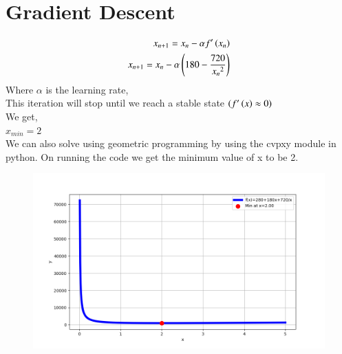 \documentclass[journal,12pt,onecolumn]{IEEEtran}
\theoremstyle{remark}
\begin{document}
\section{Gradient Descent}
\begin{align}
    x_{n+1}=x_n-\alpha f^{\prime}\left(x_n\right)\\
     x_{n+1}=x_n-\alpha \left(180-\frac{720}{{x_n}^2}\right)
\end{align}
Where $\alpha$ is the learning rate,\\
This iteration will stop until we reach a stable state $\left(f^{\prime}\left(x\right) \approx0\right)$\\
We get,\\
$x_{min}=2$\\
We can also solve using geometric programming by using the cvpxy module in python. On running the code we get the minimum value of x to be 2.
\begin{figure}[h]
\centering
\includegraphics[width=\columnwidth]{figs/Q4.png}
\end{figure}
\end{document}
